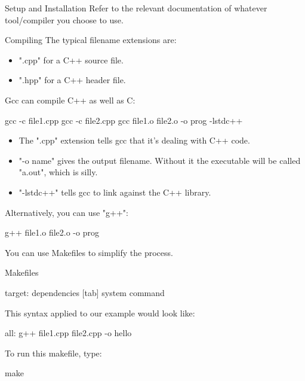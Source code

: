 \documentclass[../lecture1-introduction.tex]{subfiles}
\begin{document}
\begin{frame}[fragile]{Setup and Installation}
    Refer to the relevant documentation of whatever tool/compiler you choose to use.
\end{frame}


\begin{frame}[fragile]{Compiling}
    The typical filename extensions are:
    \begin{itemize}
        \item ".cpp" for a C++ source file.
        \item ".hpp" for a C++ header file.
    \end{itemize}
    Gcc can compile C++ as well as C:
    \begin{commandshell}
gcc -c file1.cpp
gcc -c file2.cpp
gcc file1.o file2.o -o prog -lstdc++
    \end{commandshell}
    \begin{itemize}
        \item The ".cpp" extension tells gcc that it's dealing with C++ code.
        \item "-o name" gives the output filename. Without it the executable will be
        called "a.out", which is silly.
        \item "-lstdc++" tells gcc to link against the C++ library.
    \end{itemize}
    Alternatively, you can use "g++":
    \begin{commandshell}
g++ file1.o file2.o -o prog
    \end{commandshell}
    You can use Makefiles to simplify the process.
\end{frame}


\begin{frame}[fragile]{Makefiles}
    \begin{cppcode}
target: dependencies
[tab] system command
    \end{cppcode}
    This syntax applied to our example would look like:
    \begin{cppcode}
all:
    g++ file1.cpp file2.cpp -o hello
    \end{cppcode}
    To run this makefile, type:
    \begin{commandshell}
make
    \end{commandshell}
\end{frame}
\end{document}
